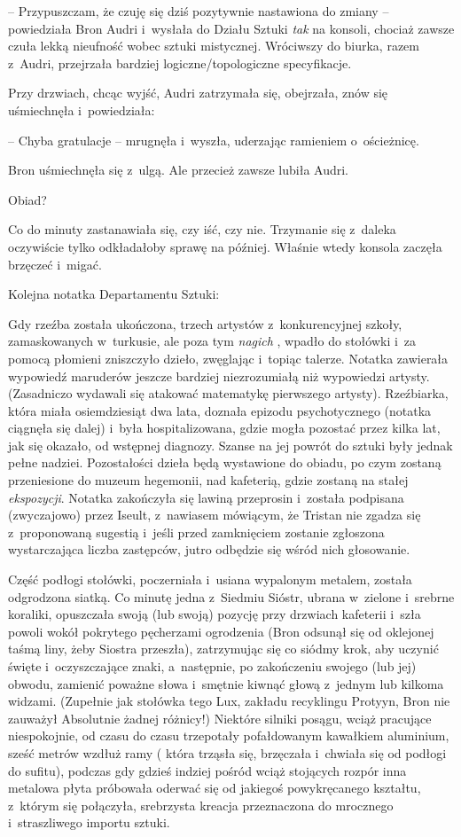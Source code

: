 \documentclass[oneside,polish,11pt,rmheadings]{mwbk}
\begin{document}
-- Przypuszczam, że czuję się dziś pozytywnie nastawiona do zmiany --  powiedziała Bron Audri i~wysłała do Działu Sztuki \textit{tak  } na konsoli, chociaż zawsze czuła lekką nieufność wobec sztuki mistycznej. Wróciwszy do biurka, razem z~Audri, przejrzała bardziej logiczne/topologiczne specyfikacje. 

Przy drzwiach, chcąc wyjść, Audri zatrzymała się, obejrzała, znów się uśmiechnęła i~powiedziała: 

-- Chyba gratulacje -- mrugnęła i~wyszła, uderzając ramieniem o~ościeżnicę. 

Bron uśmiechnęła się z~ulgą. Ale przecież zawsze lubiła Audri. 

Obiad? 

Co do minuty zastanawiała się, czy iść, czy nie. Trzymanie się z~daleka oczywiście tylko odkładałoby sprawę na później. Właśnie wtedy konsola zaczęła brzęczeć i~migać. 

Kolejna notatka Departamentu Sztuki: 

Gdy rzeźba została ukończona, trzech artystów z~konkurencyjnej szkoły, zamaskowanych w~turkusie, ale poza tym \textit{nagich }, wpadło do stołówki i~za pomocą płomieni zniszczyło dzieło, zwęglając i~topiąc talerze. Notatka zawierała wypowiedź maruderów jeszcze bardziej niezrozumiałą niż wypowiedzi artysty. (Zasadniczo wydawali się atakować matematykę pierwszego artysty). Rzeźbiarka, która miała osiemdziesiąt dwa lata, doznała epizodu psychotycznego (notatka ciągnęła się dalej) i~była hospitalizowana, gdzie mogła pozostać przez kilka lat, jak się okazało, od wstępnej diagnozy. Szanse na jej powrót do sztuki były jednak pełne nadziei. Pozostałości dzieła będą wystawione do obiadu, po czym zostaną przeniesione do muzeum hegemonii, nad kafeterią, gdzie zostaną na stałej \textit{ekspozycji}. Notatka zakończyła się lawiną przeprosin i~została podpisana (zwyczajowo) przez Iseult, z~nawiasem mówiącym, że Tristan nie zgadza się z~proponowaną sugestią i~jeśli przed zamknięciem zostanie zgłoszona wystarczająca liczba zastępców, jutro odbędzie się wśród nich głosowanie.

Część podłogi stołówki, poczerniała i~usiana wypalonym metalem, została odgrodzona siatką. Co minutę jedna z~Siedmiu Sióstr, ubrana w~zielone i~srebrne koraliki, opuszczała swoją (lub swoją) pozycję przy drzwiach kafeterii i~szła powoli wokół pokrytego pęcherzami ogrodzenia (Bron odsunął się od oklejonej taśmą liny, żeby Siostra przeszła), zatrzymując się co siódmy krok, aby uczynić święte i~oczyszczające znaki, a~następnie, po zakończeniu swojego (lub jej) obwodu, zamienić poważne słowa i~smętnie kiwnąć głową z~jednym lub kilkoma widzami. (Zupełnie jak stołówka tego Lux, zakładu recyklingu Protyyn, Bron nie zauważył Absolutnie żadnej różnicy!) Niektóre silniki posągu, wciąż pracujące niespokojnie, od czasu do czasu trzepotały pofałdowanym kawałkiem aluminium, sześć metrów wzdłuż ramy ( która trząsła się, brzęczała i~chwiała się od podłogi do sufitu), podczas gdy gdzieś indziej pośród wciąż stojących rozpór inna metalowa płyta próbowała oderwać się od jakiegoś powykręcanego kształtu, z~którym się połączyła, srebrzysta kreacja przeznaczona do mrocznego i~straszliwego importu sztuki. 
\end{document}
